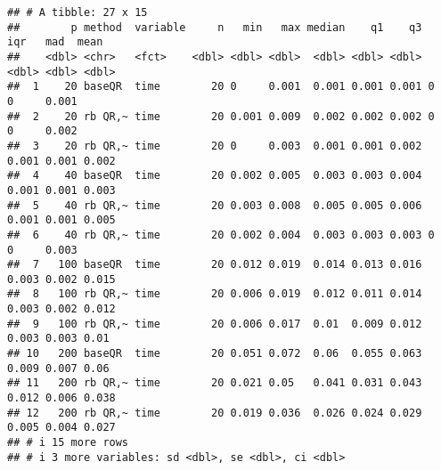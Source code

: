 \documentclass[]{tufte-handout}
\begin{document}
\begin{verbatim}
## # A tibble: 27 x 15
##        p method  variable     n   min   max median    q1    q3   iqr   mad  mean
##    <dbl> <chr>   <fct>    <dbl> <dbl> <dbl>  <dbl> <dbl> <dbl> <dbl> <dbl> <dbl>
##  1    20 baseQR  time        20 0     0.001  0.001 0.001 0.001 0     0     0.001
##  2    20 rb QR,~ time        20 0.001 0.009  0.002 0.002 0.002 0     0     0.002
##  3    20 rb QR,~ time        20 0     0.003  0.001 0.001 0.002 0.001 0.001 0.002
##  4    40 baseQR  time        20 0.002 0.005  0.003 0.003 0.004 0.001 0.001 0.003
##  5    40 rb QR,~ time        20 0.003 0.008  0.005 0.005 0.006 0.001 0.001 0.005
##  6    40 rb QR,~ time        20 0.002 0.004  0.003 0.003 0.003 0     0     0.003
##  7   100 baseQR  time        20 0.012 0.019  0.014 0.013 0.016 0.003 0.002 0.015
##  8   100 rb QR,~ time        20 0.006 0.019  0.012 0.011 0.014 0.003 0.002 0.012
##  9   100 rb QR,~ time        20 0.006 0.017  0.01  0.009 0.012 0.003 0.003 0.01 
## 10   200 baseQR  time        20 0.051 0.072  0.06  0.055 0.063 0.009 0.007 0.06 
## 11   200 rb QR,~ time        20 0.021 0.05   0.041 0.031 0.043 0.012 0.006 0.038
## 12   200 rb QR,~ time        20 0.019 0.036  0.026 0.024 0.029 0.005 0.004 0.027
## # i 15 more rows
## # i 3 more variables: sd <dbl>, se <dbl>, ci <dbl>
\end{verbatim}
\end{document}
